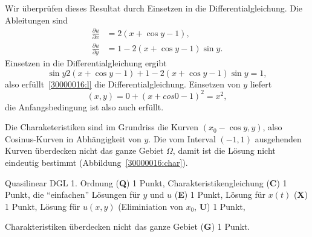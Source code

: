 \begin{loesung}
\begin{teilaufgaben}
Wir überprüfen dieses Resultat durch Einsetzen in die Differentialgleichung.
Die Ableitungen sind
\begin{align*}
\frac{\partial u}{\partial x}
&=
2(x+\cos y - 1),
\\
\frac{\partial u}{\partial y}
&=
1-2(x+\cos y - 1)\sin y.
\end{align*}
Einsetzen in die Differentialgleichung ergibt
\[
\sin y
2(x+\cos y - 1)
+
1-2(x+\cos y - 1)\sin y
=
1,
\]
also erfüllt~\eqref{30000016:l} die Differentialgleichung.
Einsetzen von $y$ liefert
\[
(x,y) = 0 + (x + cos 0 - 1)^2 = x^2,
\]
die Anfangsbedingung ist also auch erfüllt.
\item
Die Charaketeristiken sind im Grundriss die Kurven $(x_0-\cos y,y)$, also
Cosinus-Kurven in Abhängigkeit von $y$.
Die vom Interval $(-1,1)$ ausgehenden Kurven überdecken nicht das ganze
Gebiet $\Omega$, damit ist die Lösung nicht eindeutig bestimmt
(Abbildung~\ref{30000016:char}).
\qedhere
\end{teilaufgaben}
\end{loesung}

\begin{bewertung}
\begin{teilaufgaben}
\item
Quasilinear DGL 1. Ordnung ({\bf Q}) 1 Punkt,
Charakteristikengleichung ({\bf C}) 1 Punkt,
die ``einfachen'' Lösungen für $y$ und $u$ ({\bf E}) 1 Punkt,
Lösung für $x(t)$ ({\bf X}) 1 Punkt,
Lösung für $u(x,y)$ (Eliminiation von $x_0$, {\bf U}) 1 Punkt,
\item
Charakteristiken überdecken nicht das ganze Gebiet ({\bf G}) 1 Punkt.
\end{teilaufgaben}
\end{bewertung}
